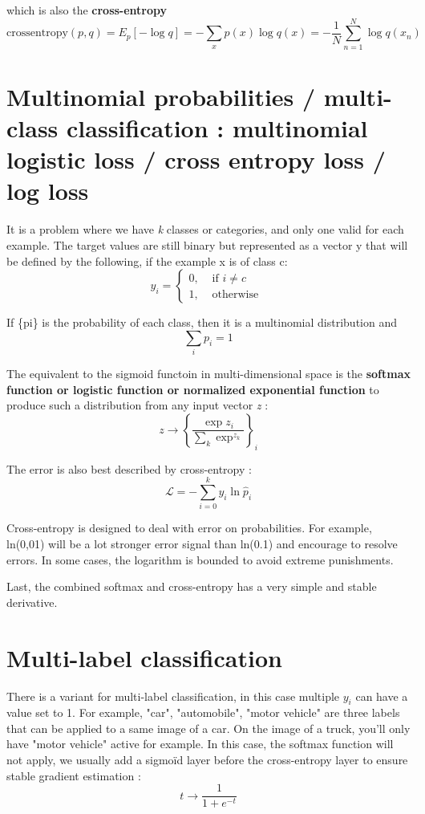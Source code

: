 \documentclass{report}
\begin{document}
which is also the \textbf{cross-entropy}
\[\text{crossentropy} (p , q ) = E_p [ -\log q ] = - \sum_x p(x ) \log q(x) = - \frac{1}{N} \sum_{n=1}^N \log q(x_n) \]

\section {Multinomial probabilities / multi-class classification : multinomial logistic loss / cross entropy loss / log loss}

It is a problem where we have \textit{k} classes or categories, and only one valid for each example.
The target values are still binary but represented as a vector y that will be defined  by the following, if the example x is of class c:
\[
  y_i = 
\begin{cases}
  0, & \text{ if } i \neq  c \\
  1, & \text{ otherwise }
\end{cases}
\]

If \{pi\} is the probability of each class, then it is a multinomial distribution and
\[ \sum_i p_i = 1\]

The equivalent to the sigmoid functoin in multi-dimensional space is the \textbf{softmax function or logistic function or normalized
  exponential function} to produce such a distribution from any input vector \textit{z} :
\[ z \rightarrow \left\{ \frac{\exp z_i }{ \sum_k \exp^{z_k} } \right\}_i \]

The error is also best described by cross-entropy :
\[ \mathscr{L} = - \sum_{i=0}^k y_i \ln \hat{p}_i \]

Cross-entropy is designed to deal with error on probabilities. For example, ln(0,01) will be a lot stronger error signal than ln(0.1)
and encourage to resolve errors. In some cases, the logarithm is bounded to avoid extreme punishments.

Last, the combined softmax and cross-entropy has a very simple and stable derivative.

\section{Multi-label classification}

There is a variant for multi-label classification, in this case multiple $y_i$ can have a value set to 1. For example, "car", "automobile",
"motor vehicle" are three labels that can be applied to a same image of a car. On the image of a truck, you'll only have "motor vehicle"
active for example. In this case, the softmax function will not apply, we usually add a sigmoïd layer before the cross-entropy layer to ensure stable gradient estimation :
\[ t \rightarrow \frac{1}{1+e^{-t}} \]
\end{document}
